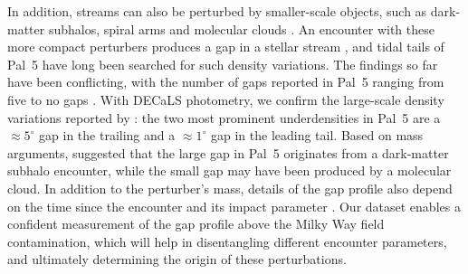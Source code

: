 \documentclass[twocolumn]{aastex62}
\newcommand{\kms}{\ensuremath{\textrm{km}~\textrm{s}^{-1}}}
\begin{document}


In addition, streams can also be perturbed by smaller-scale objects, such as dark-matter subhalos, spiral arms and molecular clouds \citep[e.g.,][]{Yoon:2011,Amorisco:2016, Banik:2019}.
An encounter with these more compact perturbers produces a gap in a stellar stream \citep[e.g.,][]{Johnston:2002,Ibata:2002}, and tidal tails of Pal~5 have long been searched for such density variations.
The findings so far have been conflicting, with the number of gaps reported in Pal~5 ranging from five \citep{Carlberg:2012} to no gaps \citep{Ibata:2016}.
With DECaLS photometry, we confirm the large-scale density variations reported by \citet{Erkal:2017}: the two most prominent underdensities in Pal~5 are a $\approx5^\circ$ gap in the trailing and a $\approx1^\circ$ gap in the leading tail.
Based on mass arguments, \citet{Erkal:2017} suggested that the large gap in Pal~5 originates from a dark-matter subhalo encounter, while the small gap may have been produced by a molecular cloud.
In addition to the perturber's mass, details of the gap profile also depend on the time since the encounter and its impact parameter \citep{Erkal:2015}.
Our dataset enables a confident measurement of the gap profile above the Milky Way field contamination, which will help in disentangling different encounter parameters, and ultimately determining the origin of these perturbations.
\end{document}

